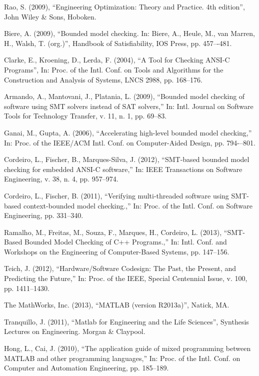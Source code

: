 \begin{thebibliography}{5}
Rao, S. (2009), ``{Engineering Optimization: Theory and Practice. 4th edition}'', John Wiley \& Sons, Hoboken.

Biere, A. (2009), ``{Bounded model checking. In: Biere, A., Heule, M., van Marren, H., Walsh, T. (org.)}'', Handbook of Satisfiability, IOS Press, pp. 457–-481.

Clarke, E., Kroening, D., Lerda, F. (2004), ``{A Tool for Checking ANSI-C Programs}'', In: Proc. of the Intl. Conf. on Tools and Algorithms for the Construction and Analysis of Systems, LNCS 2988, pp. 168--176.

Armando, A., Mantovani, J., Platania, L. (2009), ``{Bounded model checking of software using SMT solvers instead of SAT solvers},'' In: Intl. Journal on Software Tools for Technology Transfer, v. 11, n. 1, pp. 69--83.

Ganai, M., Gupta, A. (2006), ``{Accelerating high-level bounded model checking},'' In: Proc. of the IEEE/ACM Intl. Conf. on Computer-Aided Design, pp. 794-–801.

Cordeiro, L., Fischer, B., Marques-Silva, J. (2012), ``{SMT-based bounded model checking for embedded ANSI-C software},'' In: IEEE Transactions on Software Engineering, v. 38, n. 4, pp. 957--974.

Cordeiro, L., Fischer, B. (2011), ``{Verifying multi-threaded software using SMT-based context-bounded model checking.},'' In: Proc. of the Intl. Conf. on Software Engineering, pp. 331--340.

Ramalho, M., Freitas, M., Souza, F., Marques, H., Cordeiro, L. (2013), ``{SMT-Based Bounded Model Checking of C++ Programs.},'' In: Intl. Conf. and Workshops on the Engineering of Computer-Based Systems, pp. 147--156.

Teich, J. (2012), ``{Hardware/Software Codesign: The Past, the Present, and Predicting the Future},'' In: Proc. of the IEEE, Special Centennial Issue, v. 100, pp. 1411--1430.

The MathWorks, Inc. (2013), ``{MATLAB (version R2013a)}'', Natick, MA.

Tranquillo, J. (2011), ``{Matlab for Engineering and the Life Sciences}'', Synthesis Lectures on Engineering. Morgan \& Claypool.

Hong, L., Cai, J. (2010), ``{The application guide of mixed programming between MATLAB and other programming languages},'' In: Proc. of the Intl. Conf. on Computer and Automation Engineering, pp. 185--189.


\end{thebibliography}
